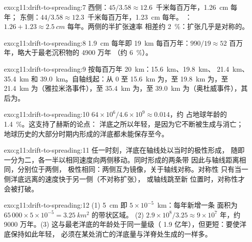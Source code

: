 \begin{solution}{exo:g11:drift-to-spreading:7}
西侧：$45/3.58 \approx 12.6$~千米每百万年，\qty{1.26}{cm} 每年；
东侧：$44/3.58 \approx 12.3$~千米每百万年，\qty{1.23}{cm} 每年。
：$1.26 + 1.23 \approx \qty{2.5}{cm}$ 每年。两侧的半扩张速率
相差约 \qty{2}{\percent}：扩张几乎是对称的。
\end{solution}

\begin{solution}{exo:g11:drift-to-spreading:8}
\qty{1.9}{cm} 每年即 \qty{19}{km} 每百万年：$990/19 \approx 52$
百万年，略大于最老沉积物的 4900 万年
（约 \qty{6}{\percent}）。
\end{solution}

\begin{solution}{exo:g11:drift-to-spreading:9}
按每百万年 \qty{20}{km}：\qty{15.6}{km}、\qty{19.8}{km}、
\qty{21.4}{km}、\qty{35.4}{km} 和 \qty{39.0}{km}。自轴线起：从 0
至 \qty{15.6}{km} 为，至 \qty{19.8}{km} 为，至 \qty{21.4}{km}
为（雅拉米洛事件），至 \qty{35.4}{km} 为，至 \qty{39.0}{km}
为（奥杜威事件），其后为。
\end{solution}

\begin{solution}{exo:g11:drift-to-spreading:10}
$64 \times 10^6/4.6 \times 10^9 \approx \num{0.014}$，约
占地球年龄的 \qty{1.4}{\percent}。这支持了赫斯的论点：
洋底之所以年轻，是因为它不断被生成与消亡；
地球历史的大部分时期内形成的洋底都未能保存至今。
\end{solution}

\begin{solution}{exo:g11:drift-to-spreading:11}
任一时刻，洋底在轴线处以当时的极性形成，
随即一分为二，各一半以相同速度向两侧移动。同时形成的两条带
因此与轴线距离相同，分别位于两侧，
极性相同：两侧互为镜像，关于轴线对称。对称性
只有当一侧洋底远离的速度快于另一侧（不对称扩张），
或轴线跳至新
位置时，对称性才会被打破。
\end{solution}

\begin{solution}{exo:g11:drift-to-spreading:12}
(1) \qty{5}{cm} 即 $5 \times 10^{-5}$~\unit{km}：每年新增一条
面积为 $65\,000 \times 5 \times 10^{-5} = \qty{3.25}{km^2}$ 的带状区域。
(2) $2.9 \times 10^8/3.25 \approx 9 \times 10^7$ 年，约
9000 万年。(3) 这与最老洋底的年龄处于同一量级（
1.9 亿年），但更短：要使洋底保持如此年轻，
必须在某处消亡的洋底量与洋脊处生成的一样多。
\end{solution}


